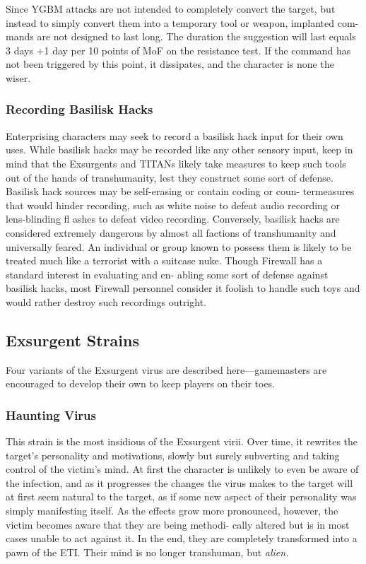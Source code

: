 Since YGBM attacks are not intended to completely 
convert the target, but instead to simply convert them 
into a temporary tool or weapon, implanted com-
mands are not designed to last long. The duration 
the suggestion will last equals 3 days +1 day per 10 
points of MoF on the resistance test. If the command 
has not been triggered by this point, it dissipates, and 
the character is none the wiser.

\subsubsection{Recording Basilisk Hacks}

Enterprising characters may seek to record a basilisk 
hack input for their own uses. While basilisk hacks may 
be recorded like any other sensory input, keep in mind 
that the Exsurgents and TITANs likely take measures 
to keep such tools out of the hands of transhumanity, 
lest they construct some sort of defense. Basilisk hack 
sources may be self-erasing or contain coding or coun-
termeasures that would hinder recording, such as white 
noise to defeat audio recording or lens-blinding fl ashes 
to defeat video recording. Conversely, basilisk hacks are 
considered extremely dangerous by almost all factions 
of transhumanity and universally feared. An individual 
or group known to possess them is likely to be treated 
much like a terrorist with a suitcase nuke. Though 
Firewall has a standard interest in evaluating and en-
abling some sort of defense against basilisk hacks, most 
Firewall personnel consider it foolish to handle such 
toys and would rather destroy such recordings outright.

\subsection{Exsurgent Strains}

Four variants of the Exsurgent virus are described 
here—gamemasters are encouraged to develop their 
own to keep players on their toes.

\subsubsection{Haunting Virus}

This strain is the most insidious of the Exsurgent virii. 
Over time, it rewrites the target's personality and 
motivations, slowly but surely subverting and taking 
control of the victim's mind. At first the character is 
unlikely to even be aware of the infection, and as it 
progresses the changes the virus makes to the target 
will at first seem natural to the target, as if some new 
aspect of their personality was simply manifesting 
itself. As the effects grow more pronounced, however, 
the victim becomes aware that they are being methodi-
cally altered but is in most cases unable to act against 
it. In the end, they are completely transformed into a 
pawn of the ETI. Their mind is no longer transhuman, 
but \textit{alien.}

